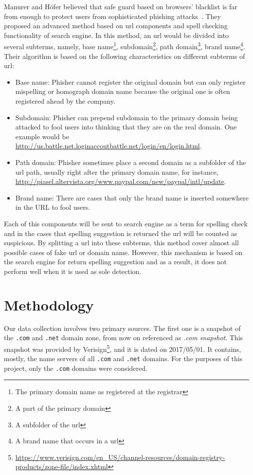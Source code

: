 \documentclass[letterpaper,twocolumn,10pt]{article}
\begin{document}
Manurer and Höfer believed that safe guard based on browsers' blacklist is far from enough to protect users from sophisticated phishing attacks~\cite{proc-eds-2012}.
They proposed an advanced method based on url components and spell checking functionality of search engine.
In this method, an url would be divided into several subterms, namely, base name\footnote{The primary domain name as registered at the registrar}, subdomain\footnote{A part of the primary domain}, path domain\footnote{A subfolder of the url}, brand name\footnote{A brand name that occurs in a url}.
Their algorithm is based on the following characteristics on different subterms of url:
\begin{itemize}
  \item Base name: Phisher cannot register the original domain but can only register mispelling or homograph domain name because the original one is often registered ahead by the company.
  \item Subdomain: Phisher can prepend subdomain to the primary domain being attacked to fool users into thinking that they are on the real domain. One example would be \url{http://us.battle.net.loginaccoutbattle.net/login/en/login.html}.
  \item Path domain: Phisher sometimes place a second domain as a subfolder of the url path, usually right after the primary domain name, for instance, \url{http://piasel.altervista.org/www.paypal.com/new/paypal/intl/update}.
  \item Brand name: There are cases that only the brand name is inserted somewhere in the URL to fool users.
\end{itemize}
Each of this components will be sent to search engine as a term for spelling check and in the cases that spelling suggestion is returned the url will be counted as suspicious.
By splitting a url into these subterms, this method cover almost all possible cases of fake url or domain name.
However, this mechanism is based on the search engine for return spelling suggestion and as a result, it does not perform well when it is used as sole detection.


\section{Methodology}
Our data collection involves two primary sources.
The first one is a snapshot of the \texttt{.com} and \texttt{.net} domain zone, from now on referenced as \textit{.com snapshot}.
This snapshot was provided by Verisign\footnote{\url{https://www.verisign.com/en_US/channel-resources/domain-registry-products/zone-file/index.xhtml}}, and it is dated on 2017/05/01.
It contains, mostly, the name servers of all \texttt{.com} and \texttt{.net} domains.
For the purposes of this project, only the \texttt{.com} domains were considered.
\end{document}
